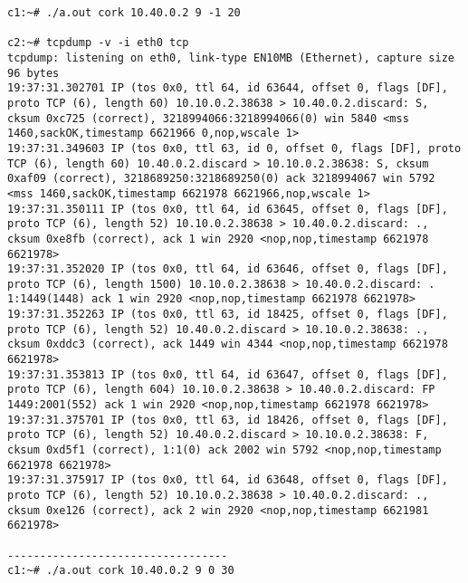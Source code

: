 \documentclass[a4paper,12pt]{article}
\begin{document}
\begin{lstlisting}
c1:~# ./a.out cork 10.40.0.2 9 -1 20

c2:~# tcpdump -v -i eth0 tcp
tcpdump: listening on eth0, link-type EN10MB (Ethernet), capture size 96 bytes
19:37:31.302701 IP (tos 0x0, ttl 64, id 63644, offset 0, flags [DF], proto TCP (6), length 60) 10.10.0.2.38638 > 10.40.0.2.discard: S, cksum 0xc725 (correct), 3218994066:3218994066(0) win 5840 <mss 1460,sackOK,timestamp 6621966 0,nop,wscale 1>
19:37:31.349603 IP (tos 0x0, ttl 63, id 0, offset 0, flags [DF], proto TCP (6), length 60) 10.40.0.2.discard > 10.10.0.2.38638: S, cksum 0xaf09 (correct), 3218689250:3218689250(0) ack 3218994067 win 5792 <mss 1460,sackOK,timestamp 6621978 6621966,nop,wscale 1>
19:37:31.350111 IP (tos 0x0, ttl 64, id 63645, offset 0, flags [DF], proto TCP (6), length 52) 10.10.0.2.38638 > 10.40.0.2.discard: ., cksum 0xe8fb (correct), ack 1 win 2920 <nop,nop,timestamp 6621978 6621978>
19:37:31.352020 IP (tos 0x0, ttl 64, id 63646, offset 0, flags [DF], proto TCP (6), length 1500) 10.10.0.2.38638 > 10.40.0.2.discard: . 1:1449(1448) ack 1 win 2920 <nop,nop,timestamp 6621978 6621978>
19:37:31.352263 IP (tos 0x0, ttl 63, id 18425, offset 0, flags [DF], proto TCP (6), length 52) 10.40.0.2.discard > 10.10.0.2.38638: ., cksum 0xddc3 (correct), ack 1449 win 4344 <nop,nop,timestamp 6621978 6621978>
19:37:31.353813 IP (tos 0x0, ttl 64, id 63647, offset 0, flags [DF], proto TCP (6), length 604) 10.10.0.2.38638 > 10.40.0.2.discard: FP 1449:2001(552) ack 1 win 2920 <nop,nop,timestamp 6621978 6621978>
19:37:31.375701 IP (tos 0x0, ttl 63, id 18426, offset 0, flags [DF], proto TCP (6), length 52) 10.40.0.2.discard > 10.10.0.2.38638: F, cksum 0xd5f1 (correct), 1:1(0) ack 2002 win 5792 <nop,nop,timestamp 6621978 6621978>
19:37:31.375917 IP (tos 0x0, ttl 64, id 63648, offset 0, flags [DF], proto TCP (6), length 52) 10.10.0.2.38638 > 10.40.0.2.discard: ., cksum 0xe126 (correct), ack 2 win 2920 <nop,nop,timestamp 6621981 6621978>

----------------------------------
c1:~# ./a.out cork 10.40.0.2 9 0 30


\end{lstlisting}
\end{document}
